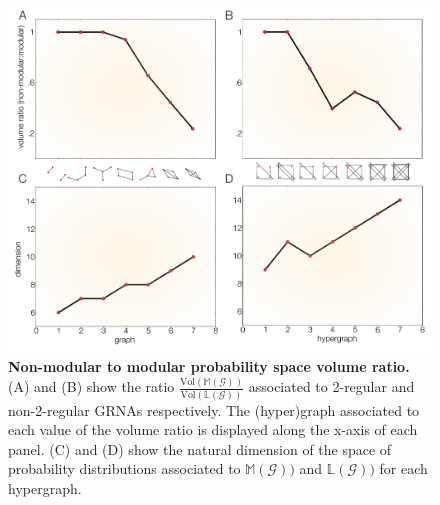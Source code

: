 \begin{figure}[!ht]
\centering
\noindent\includegraphics[width=0.9\columnwidth]{fig/figure_graphs_dims_nolines.pdf}
\caption{{\bf Non-modular to modular probability space volume ratio.} (A) and (B) show the ratio $\frac{\text{Vol}(\mathbb{M}(\mathcal{G}))}{\text{Vol}(\mathbb{L}(\mathcal{G}))}$ associated to 2-regular and non-2-regular GRNAs respectively. The (hyper)graph associated to each value of the volume ratio is displayed along the x-axis of each panel. (C) and (D) show the natural dimension of the space of probability distributions associated to $\mathbb{M}(\mathcal{G}))$ and $\mathbb{L}(\mathcal{G}))$ for each hypergraph.}
\label{fig:ncycvolrat}
\end{figure}

